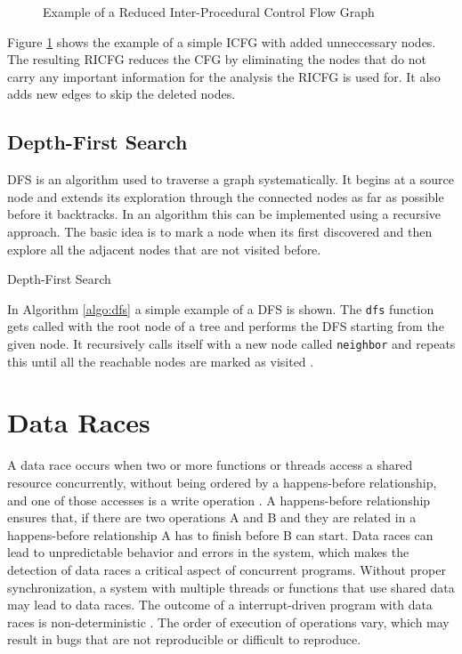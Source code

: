 \documentclass[
fancyheadings, %
%
%
]{stsreprt}
\begin{document}
{\begin{figure}[H]
\begin{tikzpicture}[node distance=2cm, scale=0.75, transform shape]
			\end{tikzpicture}
			\caption{Example of a Reduced Inter-Procedural Control Flow Graph}
			\label{ricfg}
		\end{figure}
		
		Figure \ref{ricfg} shows the example of a simple \ac{ICFG} with added unneccessary nodes. The resulting \ac{RICFG} reduces the \ac{CFG} by eliminating the nodes that do not carry any important information for the analysis the \ac{RICFG} is used for. It also adds new edges to skip the deleted nodes.
		 
		\subsection{Depth-First Search}
		\ac{DFS} is an algorithm used to traverse a graph systematically. It begins at a source node and extends its exploration through the connected nodes as far as possible before it backtracks. In an algorithm this can be implemented using a recursive approach. The basic idea is to mark a node when its first discovered and then explore all the adjacent nodes that are not visited before. 
		
		\begin{algorithm}[H]
			\label{algo:dfs}
			\caption{Depth-First Search}
			\SetAlgoLined
			
		\end{algorithm}
		
		In Algorithm \ref{algo:dfs} a simple example of a \ac{DFS} is shown. The \texttt{dfs} function gets called with the root node of a tree and performs the \ac{DFS} starting from the given node. It recursively calls itself with a new node called \texttt{neighbor} and repeats this until all the reachable nodes are marked as visited \cite{mehl2008}.
		
		
		\section{Data Races}
		
		A data race occurs when two or more functions or threads access a shared resource concurrently, without being ordered by a happens-before relationship, and one of those accesses is a write operation \cite{chen2011}. A happens-before relationship ensures that, if there are two operations A and B and they are related in a happens-before relationship A has to finish before B can start. Data races can lead to unpredictable behavior and errors in the system, which makes the detection of data races a critical aspect of concurrent programs. Without proper synchronization, a system with multiple threads or functions that use shared data may lead to data races. The outcome of a interrupt-driven program with data races is non-deterministic \cite{chen2011}. The order of execution of operations vary, which may result in bugs that are not reproducible or difficult to reproduce. 
		\newpage
		
}
\end{document}
